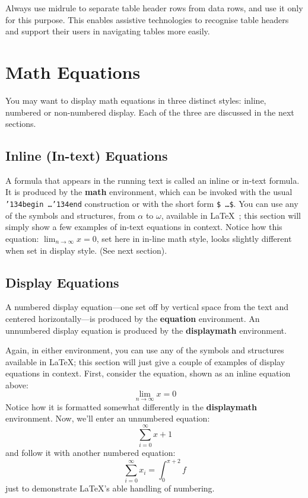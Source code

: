 \documentclass[sigconf]{nimeart}
\begin{document}
Always use midrule to separate table header rows from data rows, and
use it only for this purpose. This enables assistive technologies to
recognise table headers and support their users in navigating tables
more easily.

\section{Math Equations}
You may want to display math equations in three distinct styles:
inline, numbered or non-numbered display.  Each of the three are
discussed in the next sections.

\subsection{Inline (In-text) Equations}
A formula that appears in the running text is called an inline or
in-text formula.  It is produced by the \textbf{math} environment,
which can be invoked with the usual
\texttt{{\char'134}begin\,\ldots{\char'134}end} construction or with
the short form \texttt{\$\,\ldots\$}. You can use any of the symbols
and structures, from $\alpha$ to $\omega$, available in
\LaTeX~\cite{Lamport:LaTeX}; this section will simply show a few
examples of in-text equations in context. Notice how this equation:
\begin{math}
  \lim_{n\rightarrow \infty}x=0
\end{math},
set here in in-line math style, looks slightly different when
set in display style.  (See next section).

\subsection{Display Equations}
A numbered display equation---one set off by vertical space from the
text and centered horizontally---is produced by the \textbf{equation}
environment. An unnumbered display equation is produced by the
\textbf{displaymath} environment.

Again, in either environment, you can use any of the symbols and
structures available in \LaTeX\@; this section will just give a couple
of examples of display equations in context.  First, consider the
equation, shown as an inline equation above:
\begin{equation}
  \lim_{n\rightarrow \infty}x=0
\end{equation}
Notice how it is formatted somewhat differently in
the \textbf{displaymath}
environment.  Now, we'll enter an unnumbered equation:
\begin{displaymath}
  \sum_{i=0}^{\infty} x + 1
\end{displaymath}
and follow it with another numbered equation:
\begin{equation}
  \sum_{i=0}^{\infty}x_i=\int_{0}^{\pi+2} f
\end{equation}
just to demonstrate \LaTeX's able handling of numbering.
\end{document}
